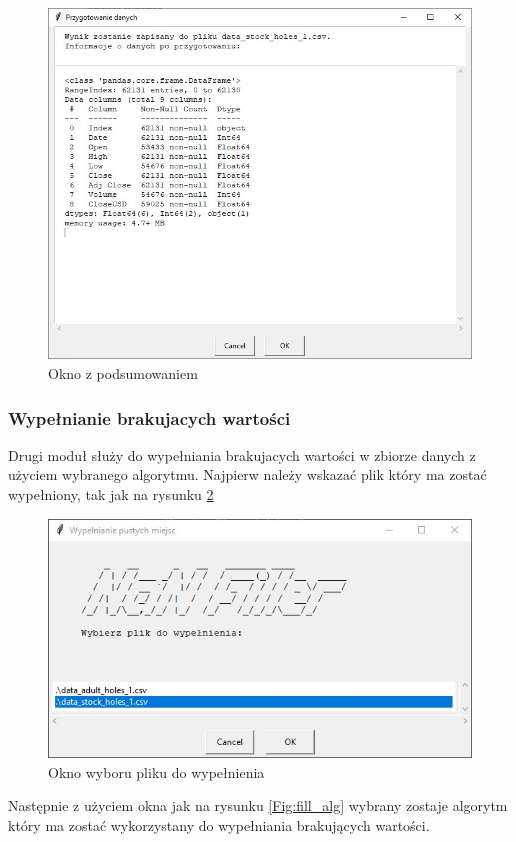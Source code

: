 \documentclass[12pt,twoside]{article}
\begin{document}
\begin{figure}[ht]
	\centering
	\includegraphics[width=12cm]{img/04.jpg}
	\caption{Okno z podsumowaniem}
\label{Fig:gen_end}
\end{figure}

\subsubsection{Wypełnianie brakujacych wartości}
Drugi moduł służy do wypełniania brakujacych wartości w zbiorze danych z użyciem wybranego algorytmu. 
Najpierw należy wskazać plik który ma zostać wypełniony, tak jak na rysunku \ref{Fig:fill_file}

\begin{figure}[ht]
	\centering
	\includegraphics[width=12cm]{img/05.jpg}
	\caption{Okno wyboru pliku do wypełnienia}
\label{Fig:fill_file}
\end{figure}

Następnie z użyciem okna jak na rysunku \ref{Fig:fill_alg} wybrany zostaje algorytm który ma zostać wykorzystany do wypełniania brakujących wartości.
\end{document}
